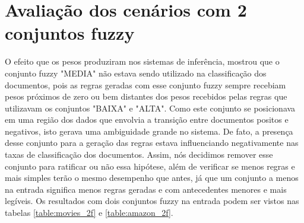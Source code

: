 \documentclass[template.tex]{subfiles}
\begin{document}
\section{Avaliação dos cenários com 2 conjuntos fuzzy}


O efeito que os pesos produziram nos sistemas de inferência, mostrou que o conjunto fuzzy "MEDIA" não estava sendo utilizado na classificação dos documentos, pois as regras geradas com esse conjunto fuzzy sempre recebiam pesos próximos de zero ou bem distantes dos pesos recebidos pelas regras que utilizavam os conjuntos "BAIXA" e "ALTA". Como este conjunto se posicionava em uma região dos dados que envolvia a transição entre documentos positos e negativos, isto gerava uma ambiguidade grande no sistema. De fato, a presença desse conjunto para a geração das regras estava influenciando negativamente nas taxas de classificação dos documentos. Assim, nós decidimos remover esse conjunto para ratificar ou não essa hipótese, além de verificar se menos regras e mais simples terão o mesmo desempenho que antes, já que um conjunto a menos na entrada significa menos regras geradas e com antecedentes menores e mais legíveis. Os resultados com dois conjuntos fuzzy na entrada podem ser vistos nas tabelas \ref{table:movies_2f} e \ref{table:amazon_2f}.
\end{document}

